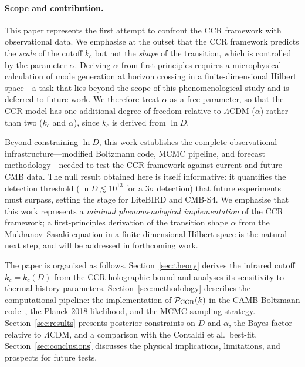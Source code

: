 \documentclass[a4paper,11pt]{article}
\begin{document}
\paragraph{Scope and contribution.}
This paper represents the first attempt to confront the CCR framework
with observational data.  We emphasise at the outset that the CCR
framework predicts the \emph{scale} of the cutoff $k_c$ but not the
\emph{shape} of the transition, which is controlled by the parameter
$\alpha$.  Deriving $\alpha$ from first principles requires a
microphysical calculation of mode generation at horizon crossing in a
finite-dimensional Hilbert space---a task that lies beyond the scope of
this phenomenological study and is deferred to future work.  We
therefore treat $\alpha$ as a free parameter, so that the CCR model
has one additional degree of freedom relative to
$\Lambda$CDM ($\alpha$) rather than two ($k_c$ and $\alpha$), since
$k_c$ is derived from $\ln D$.

Beyond constraining $\ln D$, this work establishes the complete
observational infrastructure---modified Boltzmann code, MCMC pipeline,
and forecast methodology---needed to test the CCR framework against
current and future CMB data.  The null result obtained here is itself 
informative: it quantifies the detection threshold 
($\ln D \lesssim 10^{13}$ for a $3\sigma$ detection) that future experiments 
must surpass, setting the stage for LiteBIRD and CMB-S4. We emphasise that 
this work represents a \emph{minimal phenomenological implementation} of the
CCR framework;
a first-principles derivation of the transition shape $\alpha$ from
the Mukhanov--Sasaki equation in a finite-dimensional Hilbert space
is the natural next step, and will be addressed in forthcoming work.

The paper is organised as follows. Section~\ref{sec:theory} derives the
infrared cutoff $k_c = k_c(D)$ from the CCR holographic bound and analyses
its sensitivity to thermal-history parameters.
Section~\ref{sec:methodology} describes the computational pipeline: the
implementation of $\mathcal{P}_{\rm CCR}(k)$ in the CAMB Boltzmann
code~\cite{Lewis:1999}, the Planck 2018 likelihood, and the MCMC sampling
strategy. Section~\ref{sec:results} presents posterior constraints on $D$ and
$\alpha$, the Bayes factor relative to $\Lambda$CDM, and a comparison with
the Contaldi et al.\ best-fit. Section~\ref{sec:conclusions} discusses the
physical implications, limitations, and prospects for future tests.
\end{document}
